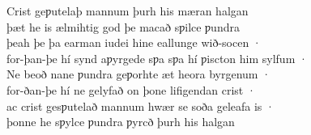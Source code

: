 \documentclass[10pt]{book}
\begin{document}
\begin{center}
{Crist geƿutelaþ mannum þurh his m\ae{}ran halgan \\
þ\ae{}t he is \ae{}lmihtig god þe macað sƿilce ƿundra \\
þeah þe þa earman iudei hine eallunge wið-socen · \\
for-þan-þe h\'i synd aƿyrgede sƿa sƿa h\'i ƿiscton him sylfum · \\
Ne beoð nane ƿundra geƿorhte \ae{}t heora byrgenum · \\
for-ðan-þe h\'i ne gelyfað on þone lifigendan crist · \\
ac crist gesƿutelað mannum hw\ae{}r se soða geleafa is · \\
þonne he sƿylce ƿundra ƿyrcð þurh his halgan \\
}
\end{center}

\settowidth{}
\end{document}
